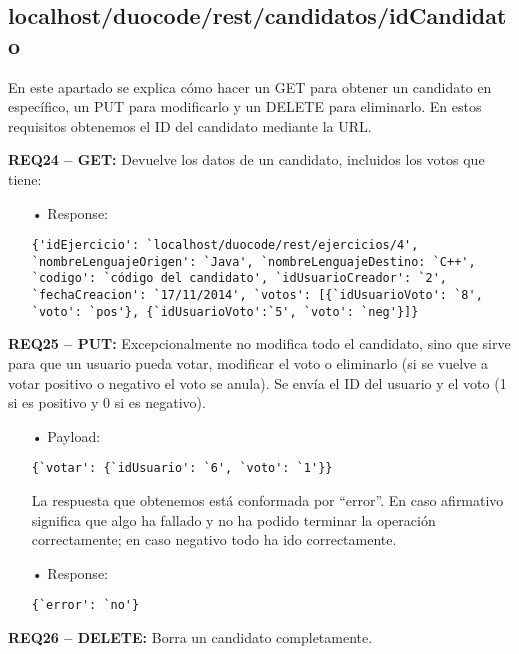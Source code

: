 \subsection{localhost/duocode/rest/candidatos/idCandidato}
En este apartado se explica cómo hacer un GET para obtener un candidato en específico, un PUT para modificarlo y un DELETE para eliminarlo.
En estos requisitos obtenemos el ID del candidato mediante la URL.
\vspace{1em}

\textbf{REQ24 – GET:} Devuelve los datos de un candidato, incluidos los votos que tiene:

\begin{itemize}
\item[•]
Response: 
{\codesize
\begin{verbatim}
{'idEjercicio': `localhost/duocode/rest/ejercicios/4', 
`nombreLenguajeOrigen': `Java', `nombreLenguajeDestino: `C++', 
`codigo': `código del candidato', `idUsuarioCreador': `2', 
`fechaCreacion': `17/11/2014', `votos': [{`idUsuarioVoto': `8', 
`voto': `pos'}, {`idUsuarioVoto':`5', `voto': `neg'}]}
\end{verbatim}
}
\end{itemize}

\textbf{REQ25 – PUT:} Excepcionalmente no modifica todo el candidato, sino que sirve para que un usuario pueda votar, modificar el voto o eliminarlo (si se vuelve a votar positivo o negativo el voto se anula). Se envía el ID del usuario y el voto (1 si es positivo y 0 si es negativo).

\begin{itemize}
\item[•]
Payload: 
{\codesize
\begin{verbatim}
{`votar': {`idUsuario': `6', `voto': `1'}}
\end{verbatim}
}

La respuesta que obtenemos está conformada por ``error''. En caso afirmativo significa que algo ha fallado y no ha podido terminar la operación correctamente; en caso negativo todo ha ido correctamente. 
\item[•]
Response:
{\codesize
\begin{verbatim} 
{`error': `no'}
\end{verbatim}
}
\end{itemize}

\textbf{REQ26 – DELETE:} Borra un candidato completamente.

